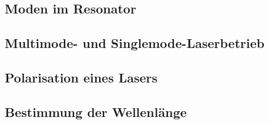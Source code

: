 \subsection{Moden im Resonator}
%

\subsection{Multimode- und Singlemode-Laserbetrieb}


\subsection{Polarisation eines Lasers}


\subsection{Bestimmung der Wellenlänge}

